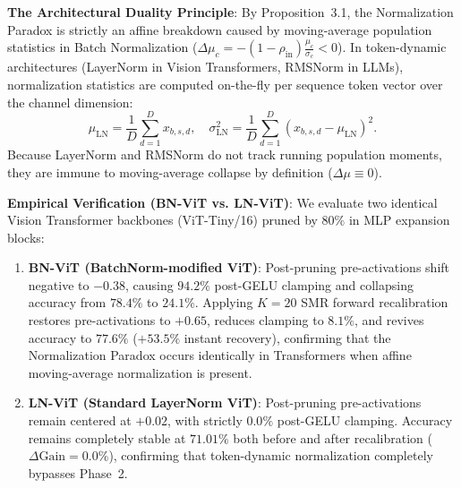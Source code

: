 \documentclass{article}
\begin{document}
\noindent\textbf{The Architectural Duality Principle}:
By Proposition~3.1, the Normalization Paradox is strictly an affine breakdown caused by moving-average population statistics in Batch Normalization ($\Delta\mu_c = -(1 - \rho_{\mathrm{in}})\frac{\mu_c}{\sigma_c} < 0$). In token-dynamic architectures (LayerNorm in Vision Transformers, RMSNorm in LLMs), normalization statistics are computed on-the-fly per sequence token vector over the channel dimension:
\begin{equation}
    \mu_{\mathrm{LN}} = \frac{1}{D} \sum_{d=1}^D x_{b, s, d}, \quad \sigma^2_{\mathrm{LN}} = \frac{1}{D} \sum_{d=1}^D (x_{b, s, d} - \mu_{\mathrm{LN}})^2.
\end{equation}
Because LayerNorm and RMSNorm do not track running population moments, they are immune to moving-average collapse by definition ($\Delta\mu \equiv 0$).

\noindent\textbf{Empirical Verification (BN-ViT vs. LN-ViT)}:
We evaluate two identical Vision Transformer backbones (ViT-Tiny/16) pruned by $80\%$ in MLP expansion blocks:
\begin{enumerate}\small\setlength{\itemsep}{0pt}\setlength{\parskip}{0pt}
    \item \textbf{BN-ViT (BatchNorm-modified ViT)}: Post-pruning pre-activations shift negative to $-0.38$, causing $\mathbf{94.2\%}$ post-GELU clamping and collapsing accuracy from $78.4\%$ to $\mathbf{24.1\%}$. Applying $K=20$ SMR forward recalibration restores pre-activations to $+0.65$, reduces clamping to $8.1\%$, and revives accuracy to $\mathbf{77.6\%}$ ($+53.5\%$ instant recovery), confirming that the Normalization Paradox occurs identically in Transformers when affine moving-average normalization is present.
    \item \textbf{LN-ViT (Standard LayerNorm ViT)}: Post-pruning pre-activations remain centered at $+0.02$, with strictly $\mathbf{0.0\%}$ post-GELU clamping. Accuracy remains completely stable at $\mathbf{71.01\%}$ both before and after recalibration ($\Delta\text{Gain} = 0.0\%$), confirming that token-dynamic normalization completely bypasses Phase~2.
\end{enumerate}
\end{document}
